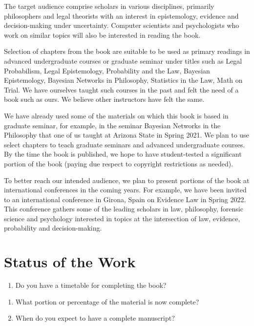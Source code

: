 \documentclass[
  10pt,
  dvipsnames,enabledeprecatedfontcommands]{scrartcl}
\providecommand{\tightlist}{%
  \setlength{\itemsep}{0pt}\setlength{\parskip}{0pt}}
\begin{document}
\normalsize

The target audience comprise scholars in various disciplines, primarily
philosophers and legal theorists with an interest in epistemology,
evidence and decision-making under uncertainty. Computer scientists and
psychologists who work on similar topics will also be interested in
reading the book.

Selection of chapters from the book are suitable to be used as primary
readings in advanced undergraduate courses or graduate seminar under
titles such as Legal Probabilism, Legal Epistemology, Probability and
the Law, Bayesian Epistemology, Bayesian Networks in Philosophy,
Statistics in the Law, Math on Trial. We have ourselves taught such
courses in the past and felt the need of a book such as ours. We believe
other instructors have felt the same.

We have already used some of the materials on which this book is based
in graduate seminar, for example, in the seminar Bayesian Networks in
the Philosophy that one of us taught at Arizona State in Spring 2021. We
plan to use select chapters to teach graduate seminars and advanced
undergraduate courses. By the time the book is published, we hope to
have student-tested a significant portion of the book (paying due
respect to copyright restrictions as needed).

To better reach our intended audience, we plan to present portions of
the book at international conferences in the coming years. For example,
we have been invited to an international conference in Girona, Spain on
Evidence Law in Spring 2022. This conference gathers some of the leading
scholars in law, philosophy, forensic science and psychology interested
in topics at the intersection of law, evidence, probability and
decision-making.

\hypertarget{status-of-the-work}{%
\section{Status of the Work}\label{status-of-the-work}}

\footnotesize

\begin{enumerate}
\def\labelenumi{\arabic{enumi}.}
\tightlist
\item
  Do you have a timetable for completing the book?
\end{enumerate}

\begin{enumerate}
\def\labelenumi{\alph{enumi}.}
\item
  What portion or percentage of the material is now complete?
\item
  When do you expect to have a complete manuscript?
\end{enumerate}
\end{document}
